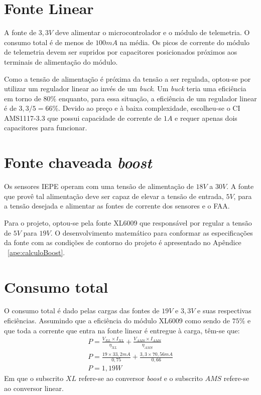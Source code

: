 \documentclass[
	12pt,				%
	openright,			%
	twoside,			%
	a4paper,			%
	english,			%
	french,				%
	spanish,			%
	brazil,				%
	]{abntex2}
\begin{document}
	\section{Fonte Linear}

		A fonte de $3,3V$ deve alimentar o microcontrolador e o módulo de
		telemetria. O consumo total é de menos de $100mA$ na média. Os
		picos de corrente do módulo de telemetria devem ser supridos por
		capacitores posicionados próximos aos terminais de alimentação
		do módulo.
		

		Como a tensão de alimentação é próxima da tensão a ser regulada,
		optou-se por utilizar um regulador linear ao invés de um
		\textit{buck}. Um \textit{buck} teria uma eficiência em torno de
		$80\%$ enquanto, para essa situação, a eficiência de um regulador
		linear é de $3,3/5 = 66\%$. Devido ao preço e à baixa
		complexidade, escolheu-se o CI AMS1117-3.3 que possui capacidade
		de corrente de $1A$ e requer apenas dois capacitores para
		funcionar.

	\section{Fonte chaveada \textit{boost}}
		Os sensores IEPE operam com uma tensão de alimentação de $18V$ a
		$30V$. A fonte que provê tal alimentação deve ser capaz de
		elevar a tensão de entrada, $5V$, para a tensão desejada e
		alimentar as fontes de corrente dos sensores e o FAA.

		Para o projeto, optou-se pela fonte XL6009 que responsável por regular a tensão de $5V$ para $19V$. O desenvolvimento matemático para conformar as especificações da fonte com as condições de contorno do projeto é apresentado no Apêndice ~\ref{ape:calculoBoost}.

	\section{Consumo total}
		O consumo total é dado pelas cargas das fontes de $19V$ e $3,3V$ e
		suas respectivas eficiências. Assumindo que a eficiência do
		módulo XL6009 como sendo de $75\%$ e que toda a corrente que entra
		na fonte linear é entregue à carga, têm-se que:
		\begin{gather*}
			P = \frac{V_{XL}\times I_{XL}}{\eta _{XL}} + \frac{V_{AMS}\times I_{AMS}}{\eta _{AMS}}\\
			P = \frac{19\times 33,2mA}{0,75} + \frac{3,3\times 70,56mA}{0,66}\\
			P = 1,19W
		\end{gather*}
		Em que o subscrito $XL$ refere-se ao conversor \textit{boost} e
		o subscrito $AMS$ refere-se ao conversor linear.
\end{document}
